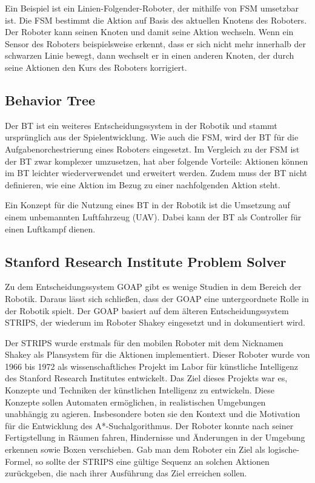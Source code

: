 Ein Beispiel ist ein Linien-Folgender-Roboter, der mithilfe von FSM umsetzbar ist. Die FSM bestimmt die Aktion auf Basis des aktuellen Knotens des Roboters. Der Roboter kann seinen Knoten und damit seine Aktion wechseln. Wenn ein Sensor des Roboters beispielsweise erkennt, dass er sich nicht mehr innerhalb der schwarzen Linie bewegt, dann wechselt er in einen anderen Knoten, der durch seine Aktionen den Kurs des Roboters korrigiert. \autocite{balogh2019using}

\subsection{Behavior Tree}
\label{chap:bt robotik}

Der BT ist ein weiteres Entscheidungssystem in der Robotik und stammt urspr\"{u}nglich aus der Spielentwicklung. Wie auch die FSM, wird der BT f\"{u}r die Aufgabenorchestrierung eines Roboters eingesetzt. Im Vergleich zu der FSM ist der BT zwar komplexer umzusetzen, hat aber folgende Vorteile: Aktionen k\"{o}nnen im BT leichter wiederverwendet und erweitert werden. Zudem muss der BT nicht definieren, wie eine Aktion im Bezug zu einer nachfolgenden Aktion steht. \autocite{iovino2022survey}

Ein Konzept f\"{u}r die Nutzung eines BT in der Robotik ist die Umsetzung auf einem unbemannten Luftfahrzeug (UAV). Dabei kann der BT als Controller f\"{u}r einen Luftkampf dienen. \autocite{btuav}

\subsection{Stanford Research Institute Problem Solver}
\label{chap:strips}

Zu dem Entscheidungssystem GOAP gibt es wenige Studien in dem Bereich der Robotik. Daraus l\"{a}sst sich schlie\ss{}en, dass der GOAP eine untergeordnete Rolle in der Robotik spielt. Der GOAP basiert auf dem \"{a}lteren Entscheidungssystem STRIPS, der wiederum im Roboter Shakey eingesetzt und in \autocite{nilsson1984shakey} dokumentiert wird.

Der STRIPS wurde erstmals f\"{u}r den mobilen Roboter mit dem Nicknamen Shakey als Plansystem f\"{u}r die Aktionen implementiert. Dieser Roboter wurde von 1966 bis 1972 als wissenschaftliches Projekt im Labor f\"{u}r k\"{u}nstliche Intelligenz des Stanford Research Institutes entwickelt. Das Ziel dieses Projekts war es, Konzepte und Techniken der k\"{u}nstlichen Intelligenz zu entwickeln. Diese Konzepte sollen Automaten erm\"{o}glichen, in realistischen Umgebungen unabh\"{a}ngig zu agieren. Insbesondere boten sie den Kontext und die Motivation f\"{u}r die Entwicklung des A*-Suchalgorithmus. Der Roboter konnte nach seiner Fertigstellung in R\"{a}umen fahren, Hindernisse und \"{A}nderungen in der Umgebung erkennen sowie Boxen verschieben. Gab man dem Roboter ein Ziel als logische-Formel, so sollte der STRIPS eine g\"{u}ltige Sequenz an solchen Aktionen zur\"{u}ckgeben, die nach ihrer Ausf\"{u}hrung das Ziel erreichen sollen.

